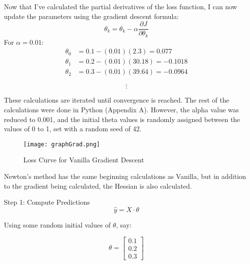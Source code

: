 \documentclass[12pt]{article}
\theoremstyle{definition}
\begin{document}
Now that I've calculated the partial derivatives of the loss function, I can now update the parameters using the gradient descent formula:
\[
\theta_k = \theta_k - \alpha \frac{\partial J}{\partial \theta_k}
\]
For \( \alpha = 0.01 \):
\[
\begin{aligned}
\theta_0 &= 0.1 - (0.01)(2.3) = 0.077 \\
\theta_1 &= 0.2 - (0.01)(30.18) = -0.1018 \\
\theta_2 &= 0.3 - (0.01)(39.64) = -0.0964
\end{aligned}
\]

\[
\vdots
\]

These calculations are iterated until convergence is reached. The rest of the calculations were done in Python (Appendix A). However, the alpha value was reduced to 0.001, and the initial theta values is randomly assigned between the values of 0 to 1, set with a random seed of 42.

\begin{figure}[h]
    \centering
    \texttt{[image: graphGrad.png]}
    \caption{Loss Curve for Vanilla Gradient Descent}
    \label{fig:enter-label}
\end{figure}

Newton's method has the same beginning calculations as Vanilla, but in addition to the gradient being calculated, the Hessian is also calculated.

Step 1: Compute Predictions
\[
\hat{y} = X \cdot \theta
\]

Using some random initial values of \( \theta \), say:

\[
\theta = \begin{bmatrix} 0.1 \\ 0.2 \\ 0.3 \end{bmatrix}
\]
\end{document}
